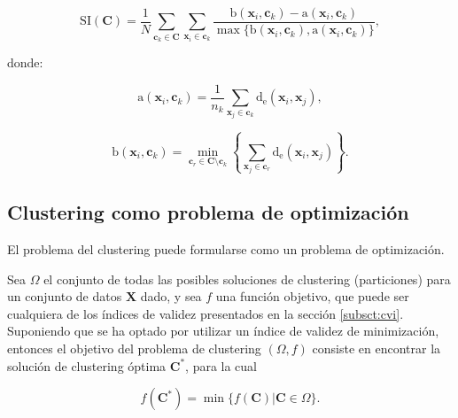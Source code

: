 \begin{itemize}
	\begin{equation}
		\text{SI}(\textbf{C}) = \frac{1}{N} \sum_{\textbf{c}_k \in \textbf{C}} \sum_{\textbf{x}_i \in \textbf{c}_k}
		\frac{\text{b}(\textbf{x}_i,\textbf{c}_k) - \text{a}(\textbf{x}_i,\textbf{c}_k)}{\max\{\text{b}(\textbf{x}_i,\textbf{c}_k),\text{a}(\textbf{x}_i,\textbf{c}_k)\}},
	\end{equation}
	
	donde:
	
	\begin{equation}\text{a}(\textbf{x}_i,\textbf{c}_k) = \frac{1}{n_k} \sum_{\textbf{x}_j \in \textbf{c}_k} \text{d}_{\text{e}}(\textbf{x}_i,\textbf{x}_j),
	\end{equation}
	
	\begin{equation}
	\text{b}(\textbf{x}_i,\textbf{c}_k) = \min_{\textbf{c}_r \in \textbf{C} \setminus \textbf{c}_k} \left\{ \sum_{\textbf{x}_j \in \textbf{c}_r} \text{d}_{\text{e}}(\textbf{x}_i,\textbf{x}_j) \right\}.
	\end{equation}
\end{itemize}
	

\subsection{Clustering como problema de optimización}\label{subsct:optclust}

El problema del clustering puede formularse como un problema de optimización.

Sea $\Omega$ el conjunto de todas las posibles soluciones de clustering (particiones) para un conjunto de datos $\textbf{X}$ dado, y sea $f$ una función objetivo, que puede ser cualquiera de los índices de validez presentados en la sección \ref{subsct:cvi}. Suponiendo que se ha optado por utilizar un índice de validez de minimización, entonces el objetivo del problema de clustering $(\Omega,f)$ consiste en encontrar la solución de clustering óptima $\textbf{C}^{*}$, para la cual

\begin{equation}
	f(\textbf{C}^{*}) = \min\{ f(\textbf{C}) | \textbf{C} \in \Omega \}.
\end{equation}



